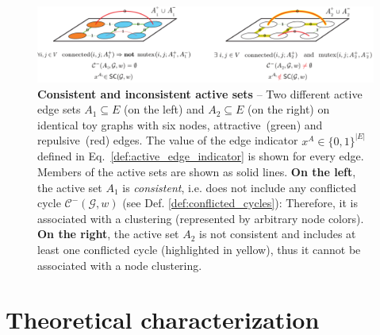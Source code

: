 
\begin{figure}[t]
    \centering 
    \includegraphics[width=\linewidth]{figures/MWS/images/consistent-sets-combined.pdf}
    \caption{\textbf{Consistent and inconsistent active sets} -- Two different active edge sets $A_1\subseteq E$ (on the left) and $A_2\subseteq E$ (on the right) on identical toy graphs with six nodes, attractive~(green) and repulsive~(red) edges. The value of the edge indicator $x^A\in \{0,1\}^{|E|}$ defined in Eq.~\ref{def:active_edge_indicator} is shown for every edge. Members of the active sets are shown as solid lines.  \textbf{On the left}, the active set $A_1$ is \emph{consistent}, i.e. does not include any conflicted cycle $\mathcal{C}^-(\mathcal{G},w)$ (see Def. \ref{def:conflicted_cycles}): Therefore, it is associated with a clustering (represented by arbitrary node colors). \textbf{On the right}, the active set $A_2$ is not consistent and includes at least one conflicted cycle (highlighted in yellow), thus it cannot be associated with a node clustering.}
\label{fig:conflicted_cycles}
\end{figure}


\section{Theoretical characterization}\label{sec:MWS_objective}

